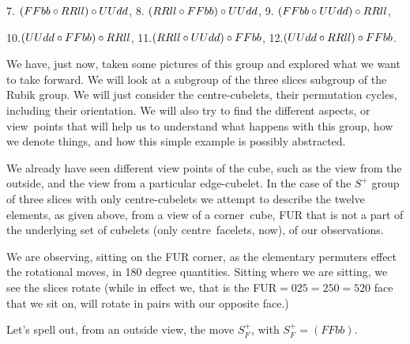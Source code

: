 7. $(FFbb\circ RRll)\circ UUdd$,
8. $(RRll\circ FFbb)\circ UUdd$,
9. $(FFbb\circ UUdd)\circ RRll$,

10.$(UUdd\circ FFbb)\circ RRll$,
11.$(RRll\circ UUdd)\circ FFbb$,
12.$(UUdd\circ RRll)\circ FFbb$.


\e We have, just now, taken some pictures of this group and
explored what we want to take forward.  We will look at
a subgroup of the three slices subgroup of the Rubik group.
We will just consider the centre-cubelets, their
permutation cycles, including their orientation.
We will also try to find the different aspects, or
view~points that will help us to understand what happens
with this group, how we denote things, and how this
simple example is possibly abstracted.

\e We already have seen different view points of the cube,
such as the view from the outside, and the view from a
particular edge-cubelet.  In the case of the $S^+$
group of three slices with only centre-cubelets we attempt
to describe the twelve elements, as given above, from
a view of a corner~cube, FUR that is not a part of
the underlying set of cubelets (only centre~facelets, now),
of our observations.

We are observing, sitting on the FUR corner, as the
elementary permuters effect the rotational moves,
in 180 degree quantities.  Sitting where we are sitting,
we see the slices rotate (while in effect we, that is
the FUR$=025=250=520$ face that we sit on,
will rotate in pairs with
our opposite face.)

Let's spell out, from an outside view, the move
$S_F^+$, with $S_F^+=(FFbb)$.

